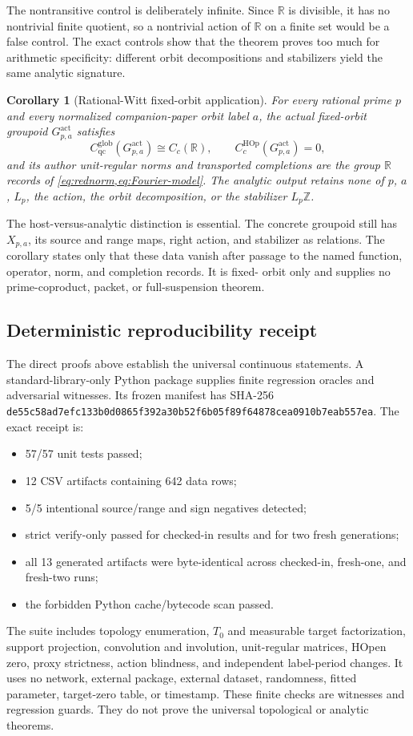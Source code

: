 \documentclass[11pt]{article}
\newtheorem{corollary}[theorem]{Corollary}
\theoremstyle{definition}
\newcommand{\R}{\mathbb R}
\newcommand{\Z}{\mathbb Z}
\newcommand{\Gact}{G_{p,a}^{\mathrm{act}}}
\newcommand{\Xpa}{X_{p,a}}
\newcommand{\Cglob}{C_{\mathrm{qc}}^{\mathrm{glob}}}
\newcommand{\CHOp}{C_c^{\mathrm{HOp}}}
\begin{document}
The nontransitive control is deliberately infinite.  Since $\R$ is
divisible, it has no nontrivial finite quotient, so a nontrivial action of
$\R$ on a finite set would be a false control.  The exact controls show that
the theorem proves too much for arithmetic specificity: different orbit
decompositions and stabilizers yield the same analytic signature.

\begin{corollary}[Rational-Witt fixed-orbit application]
\label{cor:rational-witt}
For every rational prime $p$ and every normalized companion-paper orbit label
$a$, the actual fixed-orbit groupoid $\Gact$ satisfies
\[
 \Cglob(\Gact)\cong C_c(\R),\qquad
 \CHOp(\Gact)=0,
\]
and its author unit-regular norms and transported completions are the group
$\R$ records of \cref{eq:rednorm,eq:Fourier-model}.  The analytic output
retains none of $p$, $a$, $L_p$, the action, the orbit decomposition, or the
stabilizer $L_p\Z$.
\end{corollary}

The host-versus-analytic distinction is essential.  The concrete groupoid
still has $\Xpa$, its source and range maps, right action, and stabilizer as
relations.  The corollary states only that these data vanish after passage to
the named function, operator, norm, and completion records.  It is fixed-
orbit only and supplies no prime-coproduct, packet, or full-suspension theorem.

\subsection{Deterministic reproducibility receipt}

The direct proofs above establish the universal continuous statements.  A
standard-library-only Python package supplies finite regression oracles and
adversarial witnesses.  Its frozen manifest has SHA-256
\texttt{de55c58ad7efc133b0d0865f392a30b52f6b05f89f64878cea0910b7eab557ea}.
The exact receipt is:
\begin{itemize}
\item 57/57 unit tests passed;
\item 12 CSV artifacts containing 642 data rows;
\item 5/5 intentional source/range and sign negatives detected;
\item strict verify-only passed for checked-in results and for two fresh
  generations;
\item all 13 generated artifacts were byte-identical across checked-in,
  fresh-one, and fresh-two runs;
\item the forbidden Python cache/bytecode scan passed.
\end{itemize}
The suite includes topology enumeration, $T_0$ and measurable target
factorization, support projection, convolution and involution, unit-regular
matrices, HOpen zero, proxy strictness, action blindness, and independent
label-period changes.  It uses no network, external package, external
dataset, randomness, fitted parameter, target-zero table, or timestamp.
These finite checks are witnesses and regression guards.  They do not prove
the universal topological or analytic theorems.
\end{document}
